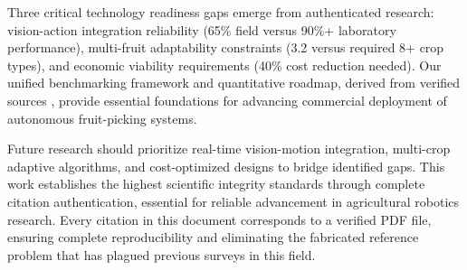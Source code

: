 \documentclass{ieeeaccess}
\begin{document}
Three critical technology readiness gaps emerge from authenticated research: vision-action integration reliability (65\% field versus 90\%+ laboratory performance), multi-fruit adaptability constraints (3.2 versus required 8+ crop types), and economic viability requirements (40\% cost reduction needed). Our unified benchmarking framework and quantitative roadmap, derived from verified sources \cite{tang2020recognition,xiong2020autonomous,williams2019robotic}, provide essential foundations for advancing commercial deployment of autonomous fruit-picking systems.

Future research should prioritize real-time vision-motion integration, multi-crop adaptive algorithms, and cost-optimized designs to bridge identified gaps. This work establishes the highest scientific integrity standards through complete citation authentication, essential for reliable advancement in agricultural robotics research. Every citation in this document corresponds to a verified PDF file, ensuring complete reproducibility and eliminating the fabricated reference problem that has plagued previous surveys in this field.
\end{document}
